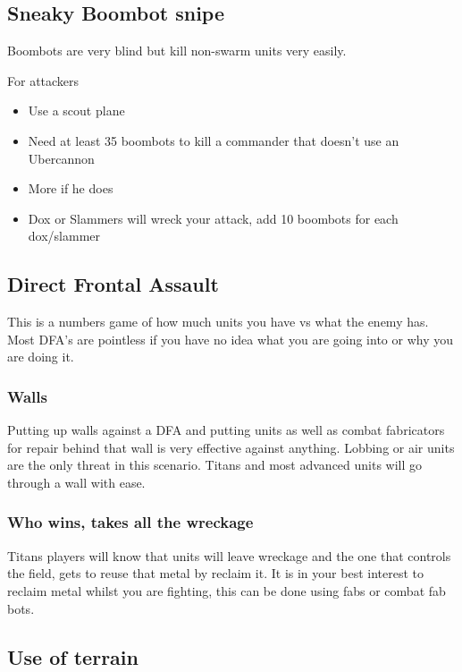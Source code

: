 \documentclass[]{article}
\begin{document}
\subsection{Sneaky Boombot snipe}

Boombots are very blind but kill non-swarm units very easily.  

For attackers 

\begin{itemize}
	\item Use a scout plane
	\item Need at least 35 boombots to kill a commander that doesn't use an Ubercannon
	\item More if he does
	\item Dox or Slammers will wreck your attack, add 10 boombots for each dox/slammer
\end{itemize}

\subsection{Direct Frontal Assault}

This is a numbers game of how much units you have vs what the enemy has.  Most DFA's are pointless if you have no idea what you are going into or why you are doing it. 

\subsubsection{Walls} 

Putting up walls against a DFA and putting units as well as combat fabricators for repair behind that wall is very effective against anything.  Lobbing or air units are the only threat in this scenario.  Titans and most advanced units will go through a wall with ease.  

\subsubsection{Who wins, takes all the wreckage}

Titans players will know that units will leave wreckage and the one that controls the field, gets to reuse that metal by reclaim it.  It is in your best interest to reclaim metal whilst you are fighting, this can be done using fabs or combat fab bots.  


\subsection{Use of terrain}
\end{document}
